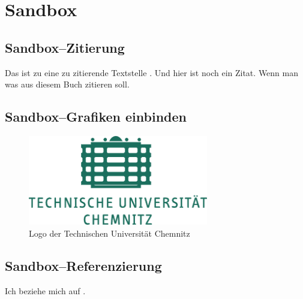 \section{Sandbox}

\subsection{Sandbox--Zitierung}

Das ist zu eine zu zitierende Textstelle \cite{Hesse2016}.
Und hier ist noch ein Zitat.\cite{Vogt2003}
Wenn man was aus diesem Buch zitieren soll. \cite{Quarteroni2005}

\subsection{Sandbox--Grafiken einbinden}

\begin{figure}[htbp] 
  \centering
     \includegraphics[width=0.7\textwidth]{img/logo_tuc.pdf}
  \caption{Logo der Technischen Universität Chemnitz}
  \label{fig:Bild1}
\end{figure}

\newpage

\newpage


\subsection{Sandbox--Referenzierung}

Ich beziehe mich auf .